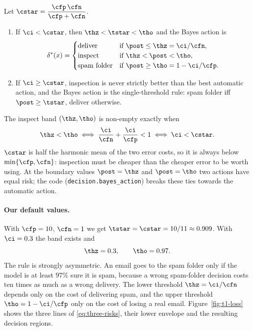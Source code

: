 \begin{proposition}\label{prop:band}
Let $\cstar = \dfrac{\cfp\,\cfn}{\cfp+\cfn}$.
\begin{enumerate}[label=(\alph*),itemsep=1pt,topsep=2pt]
  \item If $\ci<\cstar$, then $\thz<\tstar<\tho$ and the Bayes action is
        \begin{equation}
          \delta^\ast(x) =
          \begin{cases}
            \text{deliver}     & \text{if } \post \le \thz = \ci/\cfn, \\
            \text{inspect}     & \text{if } \thz < \post < \tho, \\
            \text{spam folder} & \text{if } \post \ge \tho = 1-\ci/\cfp .
          \end{cases}
          \label{eq:thresholds}
        \end{equation}
  \item If $\ci\ge\cstar$, inspection is never strictly better than the best automatic action, and the
        Bayes action is the single-threshold rule: spam folder iff $\post\ge\tstar$, deliver otherwise.
\end{enumerate}
\end{proposition}

The inspect band $(\thz,\tho)$ is non-empty exactly when
\[
  \thz<\tho \iff \frac{\ci}{\cfn}+\frac{\ci}{\cfp}<1 \iff \ci<\cstar .
\]
$\cstar$ is half the harmonic mean of the two error costs, so it is always below $\min\{\cfp,\cfn\}$:
inspection must be cheaper than the cheaper error to be worth using. At the boundary values
$\post=\thz$ and $\post=\tho$ two actions have equal risk; the code (\texttt{decision.bayes\_action})
breaks these ties towards the automatic action.

\paragraph{Our default values.}
With $\cfp=10$, $\cfn=1$ we get $\tstar=\cstar=10/11\approx0.909$. With $\ci=0.3$ the band exists and
\[
  \thz = 0.3, \qquad \tho = 0.97 .
\]
The rule is strongly asymmetric. An email goes to the spam folder only if the model is at least $97\%$
sure it is spam, because a wrong spam-folder decision costs ten times as much as a wrong delivery. The
lower threshold $\thz=\ci/\cfn$ depends only on the cost of delivering spam, and the upper threshold
$\tho=1-\ci/\cfp$ only on the cost of losing a real email. Figure~\ref{fig:t1-loss} shows the three
lines of \eqref{eq:three-risks}, their lower envelope and the resulting decision regions.

